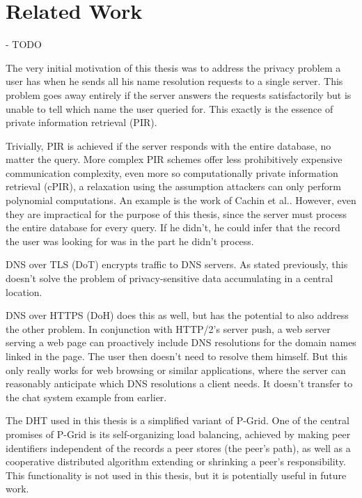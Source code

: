 \chapter{Related Work}
\label{chap:related_work}
- TODO

The very initial motivation of this thesis was to address the privacy problem a
user has when he sends all his name resolution requests to a single server. This
problem goes away entirely if the server answers the requests satisfactorily but
is unable to tell which name the user queried for. This exactly is the essence
of private information retrieval (PIR)\cite{gasarch2004survey}.

Trivially, PIR is achieved if the server responds with the entire database, no
matter the query. More complex PIR schemes offer less prohibitively expensive
communication complexity, even more so computationally private information
retrieval (cPIR), a relaxation using the assumption attackers can only perform
polynomial computations. An example is the work of Cachin et
al.\cite{cachin1999computationally}. However, even they are impractical for the
purpose of this thesis, since the server must process the entire database for
every query. If he didn't, he could infer that the record the user was looking
for was in the part he didn't process.

DNS over TLS (DoT)\cite{RFC7858} encrypts traffic to DNS servers. As stated
previously, this doesn't solve the problem of privacy-sensitive data
accumulating in a central location.

DNS over HTTPS (DoH)\cite{RFC8484} does this as well, but has the potential to
also address the other problem. In conjunction with HTTP/2's server
push\cite{RFC7540}, a web server serving a web page can proactively include DNS
resolutions for the domain names linked in the page. The user then doesn't need
to resolve them himself. But this only really works for web browsing or similar
applications, where the server can reasonably anticipate which DNS resolutions a
client needs. It doesn't transfer to the chat system example from earlier.

The \ac{DHT} used in this thesis is a simplified variant of
P-Grid\cite{aberer2001pgrid}. One of the central promises of P-Grid is its
self-organizing load balancing, achieved by making peer identifiers independent
of the records a peer stores (the peer's path), as well as a cooperative
distributed algorithm extending or shrinking a peer's responsibility. This
functionality is not used in this thesis, but it is potentially useful in future
work.

